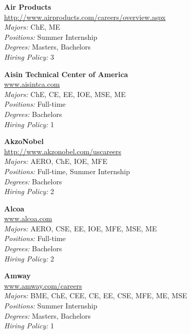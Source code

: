 \documentclass{article}
\begin{document}
\begin{center}
\begin{multicols}{3}
\begin{minipage}{.9\columnwidth}{\Large\bf Air Products }\\
	\url{http://www.airproducts.com/careers/overview.aspx}\\
	\emph{Majors:} ChE, ME\\
	\emph{Positions:} Summer Internship\\
	\emph{Degrees:} Masters, Bachelors\\
	\emph{Hiring Policy:} 3\\
\end{minipage}
 
\begin{minipage}{.9\columnwidth}{\Large\bf Aisin Technical Center of America }\\
	\url{www.aisintca.com}\\
	\emph{Majors:} ChE, CE, EE, IOE, MSE, ME\\
	\emph{Positions:} Full-time\\
	\emph{Degrees:} Bachelors\\
	\emph{Hiring Policy:} 1\\
\end{minipage}
 
\begin{minipage}{.9\columnwidth}{\Large\bf AkzoNobel }\\
	\url{http://www.akzonobel.com/uscareers}\\
	\emph{Majors:} AERO, ChE, IOE, MFE\\
	\emph{Positions:} Full-time, Summer Internship\\
	\emph{Degrees:} Bachelors\\
	\emph{Hiring Policy:} 2\\
\end{minipage}
 
\begin{minipage}{.9\columnwidth}{\Large\bf Alcoa }\\
	\url{www.alcoa.com}\\
	\emph{Majors:} AERO, CSE, EE, IOE, MFE, MSE, ME\\
	\emph{Positions:} Full-time\\
	\emph{Degrees:} Bachelors\\
	\emph{Hiring Policy:} 2\\
\end{minipage}
 
\begin{minipage}{.9\columnwidth}{\Large\bf Amway }\\
	\url{www.amway.com/careers}\\
	\emph{Majors:} BME, ChE, CEE, CE, EE, CSE, MFE, ME, MSE\\
	\emph{Positions:} Summer Internship\\
	\emph{Degrees:} Masters, Bachelors\\
	\emph{Hiring Policy:} 1\\
\end{minipage}
 

\end{multicols}
\end{center}
\end{document}
